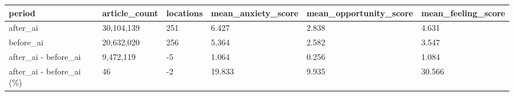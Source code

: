 \begin{tabular}{llllll}
\toprule
period & article\_count & locations & mean\_anxiety\_score & mean\_opportunity\_score & mean\_feeling\_score \\
\midrule
after\_ai & 30,104,139 & 251 & 6.427 & 2.838 & 4.631 \\
before\_ai & 20,632,020 & 256 & 5.364 & 2.582 & 3.547 \\
after\_ai - before\_ai & 9,472,119 & -5 & 1.064 & 0.256 & 1.084 \\
after\_ai - before\_ai (\%) & 46 & -2 & 19.833 & 9.935 & 30.566 \\
\bottomrule
\end{tabular}
